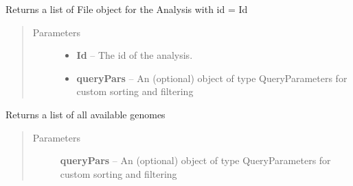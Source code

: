\documentclass[letterpaper,10pt,english]{sphinxmanual}
\begin{document}
\begin{fulllineitems}

\begin{fulllineitems}
\label{Available modules:BaseSpacePy.api.BaseSpaceAPI.BaseSpaceAPI.getAnalysisFiles}
Returns a list of File object for the Analysis with id  = Id
\begin{quote}\begin{description}
\item[{Parameters}] \leavevmode\begin{itemize}
\item {} 
\textbf{Id} -- The id of the analysis.

\item {} 
\textbf{queryPars} -- An (optional) object of type QueryParameters for custom sorting and filtering

\end{itemize}

\end{description}\end{quote}

\end{fulllineitems}


\begin{fulllineitems}
\label{Available modules:BaseSpacePy.api.BaseSpaceAPI.BaseSpaceAPI.getAvailableGenomes}
Returns a list of all available genomes
\begin{quote}\begin{description}
\item[{Parameters}] \leavevmode
\textbf{queryPars} -- An (optional) object of type QueryParameters for custom sorting and filtering

\end{description}\end{quote}

\end{fulllineitems}



\end{fulllineitems}
\end{document}
